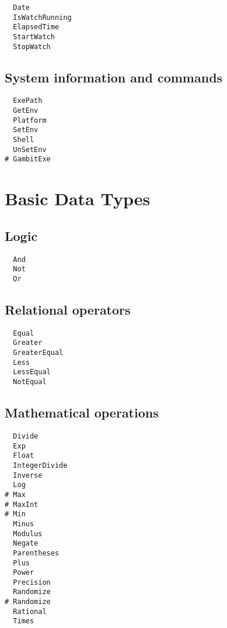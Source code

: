 \begin{multicols}{3}
\begin{verbatim}
  Date 
  IsWatchRunning 
  ElapsedTime 
  StartWatch 
  StopWatch 
\end{verbatim}
\end{multicols}

\subsection{System information and commands}

\begin{multicols}{3}
\begin{verbatim}
  ExePath 
  GetEnv 
  Platform 
  SetEnv 
  Shell 
  UnSetEnv 
# GambitExe 
\end{verbatim}
\end{multicols}

\section{Basic Data Types}

\subsection{Logic}

\begin{multicols}{3}
\begin{verbatim}
  And 
  Not 
  Or 
\end{verbatim}
\end{multicols}

\subsection{Relational operators}

\begin{multicols}{3}
\begin{verbatim}
  Equal 
  Greater 
  GreaterEqual 
  Less 
  LessEqual 
  NotEqual 
\end{verbatim}
\end{multicols}

\subsection{Mathematical operations}

\begin{multicols}{3}
\begin{verbatim}
  Divide 
  Exp 
  Float
  IntegerDivide 
  Inverse
  Log 
# Max
# MaxInt
# Min
  Minus 
  Modulus 
  Negate 
  Parentheses 
  Plus 
  Power 
  Precision
  Randomize 
# Randomize 
  Rational
  Times 
\end{verbatim}
\end{multicols}


